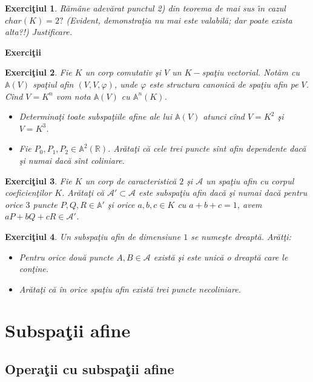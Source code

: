 \documentclass[12pt]{book}
\newtheorem{exe}{Exerci\c tiul }
\begin{document}
\begin{exe}
R\u am\^ane adev\u arat punctul 2) din teorema de mai sus \^{\i}n cazul $char(K)=2?$ (Evident, demonstra\c tia nu mai este valabil\u a; dar poate exista alta?!) Justificare.
\end{exe}
\begin{center} {\bf Exerci\c tii}
\end{center}
\begin{exe}
Fie $K$ un corp comutativ \c si $V$ un $K-$spa\c tiu vectorial. Not\u am cu 
$\mathbb{A}(V)$ spa\c tiul afin $(V,V,\varphi)$, unde $\varphi$ este structura
canonic\u  a de spa\c tiu afin pe $V$. C\^ind $V=K^n$ vom nota $\mathbb{A}(V)$
cu $\mathbb{A}^n(K)$.
\begin{itemize}
\item[a)] Determina\c ti toate subspa\c tiile afine ale lui $\mathbb{A}(V)$ atunci 
c\^ind $V=K^2$ \c si $V=K^3$.
\item[b)] Fie $P_0,P_1,P_2 \in \mathbb{A}^2(\mathbb{R})$. Ar\u ata\c ti c\u a cele trei puncte s\^int afin dependente dac\u a \c si numai dac\u a s\^int coliniare.
\end{itemize} 
\end{exe}
\begin{exe}
Fie $K$ un corp de caracteristic\u a $2$ \c si $\mathcal{A}$ un spa\c tiu afin cu
corpul coeficien\c tilor $K$. Ar\u ata\c ti c\u a $\mathcal{A}' \subset \mathcal{A}$
este subspa\c tiu afin dac\u a \c si numai dac\u a pentru orice $3$ puncte $P,Q,R \in 
\mathbb{A}'$ \c si orice $a,b,c \in K$ cu $a+b+c=1$, avem $aP+bQ+cR \in
\mathcal{A}'$.
\end{exe}
\begin{exe}
Un subspa\c tiu afin de dimensiune $1$ se nume\c ste dreapt\u a. Ar\u at\c ti:
\begin{itemize}
\item[a)] Pentru orice dou\u a puncte $A,B \in \mathcal{A}$ exist\u a \c si este
unic\u a o dreapt\u a care le con\c tine.
\item[b)] Ar\u ata\c ti c\u a \^in orice spa\c tiu afin exist\u a trei puncte necoliniare.
\end{itemize}
\end{exe}
\newpage

\section{Subspa\c tii afine}
\subsection{Opera\c tii cu subspa\c tii afine}
\end{document}
